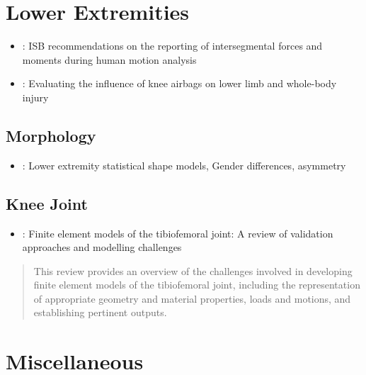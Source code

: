 \documentclass[]{book}
\providecommand{\tightlist}{%
  \setlength{\itemsep}{0pt}\setlength{\parskip}{0pt}}
\begin{document}
\hypertarget{lower-extremities}{%
\chapter{Lower Extremities}\label{lower-extremities}}

\begin{itemize}
\item
  \citet{Derrick2019}: ISB recommendations on the reporting of intersegmental forces and moments during human motion analysis
\item
  \citet{McMurry2019}: Evaluating the influence of knee airbags on lower limb and whole-body injury
\end{itemize}

\hypertarget{morphology}{%
\section{Morphology}\label{morphology}}

\begin{itemize}
\tightlist
\item
  \citet{Audenaert2019}: Lower extremity statistical shape models, Gender differences, asymmetry
\end{itemize}

\hypertarget{knee-joint}{%
\section{Knee Joint}\label{knee-joint}}

\begin{itemize}
\tightlist
\item
  \citet{Cooper2019}: Finite element models of the tibiofemoral joint: A review of validation approaches and modelling challenges
\end{itemize}

\begin{quote}
This review provides an overview of the challenges involved in developing finite element models of the tibiofemoral joint, including the representation of appropriate geometry and material properties, loads and motions, and establishing pertinent outputs.
\end{quote}

\hypertarget{miscellaneous}{%
\chapter{Miscellaneous}\label{miscellaneous}}
\end{document}
